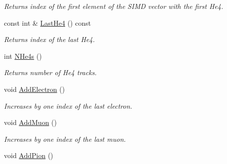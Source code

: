 \begin{DoxyCompactItemize}
\begin{DoxyCompactList}\small\item\em Returns index of the first element of the S\+I\+MD vector with the first He4. \end{DoxyCompactList}\item 
const int \& \hyperlink{classKFPTrackVector_a96e5789581b9c8fa17affa20586f7a72}{Last\+He4} () const \hypertarget{classKFPTrackVector_a96e5789581b9c8fa17affa20586f7a72}{}\label{classKFPTrackVector_a96e5789581b9c8fa17affa20586f7a72}

\begin{DoxyCompactList}\small\item\em Returns index of the last He4. \end{DoxyCompactList}\item 
int \hyperlink{classKFPTrackVector_a36c06ee6adca72fe5eb4e4c7e81e0490}{N\+He4s} ()\hypertarget{classKFPTrackVector_a36c06ee6adca72fe5eb4e4c7e81e0490}{}\label{classKFPTrackVector_a36c06ee6adca72fe5eb4e4c7e81e0490}

\begin{DoxyCompactList}\small\item\em Returns number of He4 tracks. \end{DoxyCompactList}\item 
void \hyperlink{classKFPTrackVector_aaefdc130f82949bf3f03bda38246eb2a}{Add\+Electron} ()\hypertarget{classKFPTrackVector_aaefdc130f82949bf3f03bda38246eb2a}{}\label{classKFPTrackVector_aaefdc130f82949bf3f03bda38246eb2a}

\begin{DoxyCompactList}\small\item\em Increases by one index of the last electron. \end{DoxyCompactList}\item 
void \hyperlink{classKFPTrackVector_acef80deab44df4eeba7621d50667ef7a}{Add\+Muon} ()\hypertarget{classKFPTrackVector_acef80deab44df4eeba7621d50667ef7a}{}\label{classKFPTrackVector_acef80deab44df4eeba7621d50667ef7a}

\begin{DoxyCompactList}\small\item\em Increases by one index of the last muon. \end{DoxyCompactList}\item 
void \hyperlink{classKFPTrackVector_ac56d940d90a5e12135d2a30af5a6b380}{Add\+Pion} ()\hypertarget{classKFPTrackVector_ac56d940d90a5e12135d2a30af5a6b380}{}\label{classKFPTrackVector_ac56d940d90a5e12135d2a30af5a6b380}


\end{DoxyCompactItemize}
